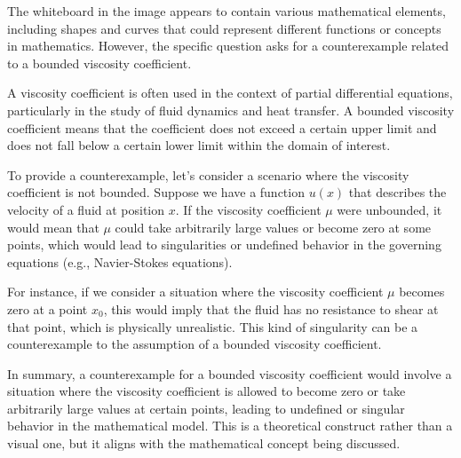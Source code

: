 The whiteboard in the image appears to contain various mathematical elements, including shapes and curves that could represent different functions or concepts in mathematics. However, the specific question asks for a counterexample related to a bounded viscosity coefficient.

A viscosity coefficient is often used in the context of partial differential equations, particularly in the study of fluid dynamics and heat transfer. A bounded viscosity coefficient means that the coefficient does not exceed a certain upper limit and does not fall below a certain lower limit within the domain of interest.

To provide a counterexample, let's consider a scenario where the viscosity coefficient is not bounded. Suppose we have a function \( u(x) \) that describes the velocity of a fluid at position \( x \). If the viscosity coefficient \( \mu \) were unbounded, it would mean that \( \mu \) could take arbitrarily large values or become zero at some points, which would lead to singularities or undefined behavior in the governing equations (e.g., Navier-Stokes equations).

For instance, if we consider a situation where the viscosity coefficient \( \mu \) becomes zero at a point \( x_0 \), this would imply that the fluid has no resistance to shear at that point, which is physically unrealistic. This kind of singularity can be a counterexample to the assumption of a bounded viscosity coefficient.

In summary, a counterexample for a bounded viscosity coefficient would involve a situation where the viscosity coefficient is allowed to become zero or take arbitrarily large values at certain points, leading to undefined or singular behavior in the mathematical model. This is a theoretical construct rather than a visual one, but it aligns with the mathematical concept being discussed.